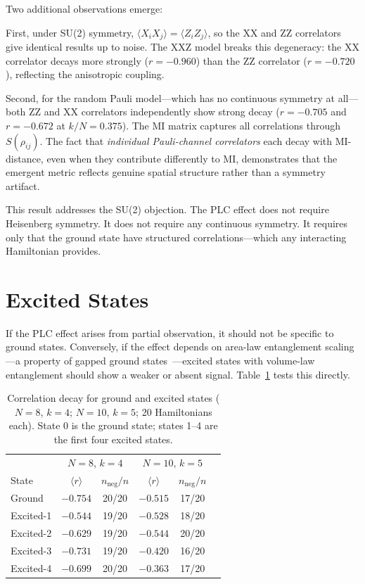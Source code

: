 \documentclass[aps,pra,twocolumn,superscriptaddress]{revtex4-2}
\begin{document}
Two additional observations emerge:

First, under SU(2) symmetry, $\langle X_i X_j \rangle = \langle Z_i Z_j \rangle$, so the XX and ZZ correlators give identical results up to noise. The XXZ model breaks this degeneracy: the XX correlator decays more strongly ($r = -0.960$) than the ZZ correlator ($r = -0.720$), reflecting the anisotropic coupling.

Second, for the random Pauli model---which has no continuous symmetry at all---both ZZ and XX correlators independently show strong decay ($r = -0.705$ and $r = -0.672$ at $k/N = 0.375$). The MI matrix captures all correlations through $S(\rho_{ij})$. The fact that \emph{individual Pauli-channel correlators} each decay with MI-distance, even when they contribute differently to MI, demonstrates that the emergent metric reflects genuine spatial structure rather than a symmetry artifact.

This result addresses the SU(2) objection. The PLC effect does not require Heisenberg symmetry. It does not require any continuous symmetry. It requires only that the ground state have structured correlations---which any interacting Hamiltonian provides.


\section{Excited States}
\label{sec:excited}

If the PLC effect arises from partial observation, it should not be specific to ground states. Conversely, if the effect depends on area-law entanglement scaling---a property of gapped ground states~\cite{hastings2007}---excited states with volume-law entanglement should show a weaker or absent signal. Table~\ref{tab:excited} tests this directly.

\begin{table}[t]
\caption{Correlation decay for ground and excited states ($N = 8$, $k = 4$; $N = 10$, $k = 5$; 20 Hamiltonians each). State 0 is the ground state; states 1--4 are the first four excited states.}
\label{tab:excited}
\begin{ruledtabular}
\begin{tabular}{lccccc}
 & \multicolumn{2}{c}{$N = 8$, $k = 4$} & \multicolumn{2}{c}{$N = 10$, $k = 5$} \\
State & $\langle r \rangle$ & $n_\text{neg}/n$ & $\langle r \rangle$ & $n_\text{neg}/n$ \\
\colrule
Ground & $-0.754$ & 20/20 & $-0.515$ & 17/20 \\
Excited-1 & $-0.544$ & 19/20 & $-0.528$ & 18/20 \\
Excited-2 & $-0.629$ & 19/20 & $-0.544$ & 20/20 \\
Excited-3 & $-0.731$ & 19/20 & $-0.420$ & 16/20 \\
Excited-4 & $-0.699$ & 20/20 & $-0.363$ & 17/20 \\
\end{tabular}
\end{ruledtabular}
\end{table}
\end{document}
